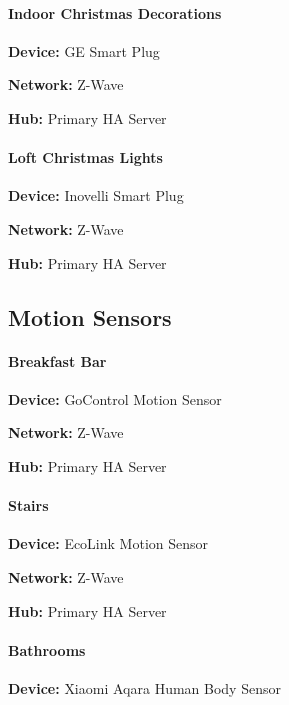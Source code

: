 \documentclass[]{article}
\let\oldparagraph\paragraph
\renewcommand{\paragraph}[1]{\oldparagraph{#1}\mbox{}}
\begin{document}
\begin{multicols}{2}
\paragraph{\texorpdfstring{{Indoor Christmas Decorations}}{Indoor Christmas Decorations}}

\textbf{Device: }
{GE Smart Plug}

\textbf{Network: }
{Z-Wave}

\textbf{Hub: }
{Primary HA Server}

\paragraph{\texorpdfstring{{Loft Christmas Lights}}{Loft Christmas Lights}}

\textbf{Device: }
{Inovelli Smart Plug}

\textbf{Network: }
{Z-Wave}

\textbf{Hub: }
{Primary HA Server}

\newpage

\subsection{\texorpdfstring{{Motion Sensors}}{Motion Sensors}}

\paragraph{\texorpdfstring{{Breakfast Bar}}{Breakfast Bar}}

\textbf{Device: }
{GoControl Motion Sensor}

\textbf{Network: }
{Z-Wave}

\textbf{Hub: }
{Primary HA Server}

\paragraph{\texorpdfstring{{Stairs}}{Stairs}}

\textbf{Device: }
{EcoLink Motion Sensor}

\textbf{Network: }
{Z-Wave}

\textbf{Hub: }
{Primary HA Server}

\paragraph{\texorpdfstring{{Bathrooms}}{Bathrooms}}

\textbf{Device: }
{Xiaomi Aqara Human Body Sensor}


\end{multicols}
\end{document}
